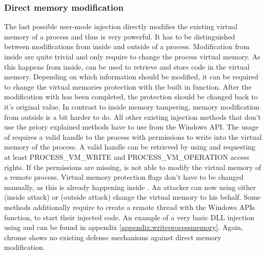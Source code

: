 \subsubsection{Direct memory modification}
The last possible user-mode injection directly modifies the existing virtual memory of a process and thus is very powerful. It has to be distinguished between modifications from inside and outside of a process. Modification from inside are quite trivial and only require to change the process virtual memory. As this happens from inside,  can be used to retrieve and store code in the virtual memory. Depending on which information should be modified, it can be required to change the virtual memories protection with the built in  function. After the modification with  has been completed, the protection should be changed back to it's original value. In contrast to inside memory tampering, memory modification from outside is a bit harder to do. All other existing injection methods that don't use the priory explained methods have to use  from the Windows API. The usage of  requires a valid handle to the process with permissions to write into the virtual memory of the process. A valid handle can be retrieved by using  and requesting at least PROCESS\_VM\_WRITE and PROCESS\_VM\_OPERATION access rights. If the permissions are missing,  is not able to modify the virtual memory of a remote process. Virtual memory protection flags don't have to be changed manually, as this is already happening inside . An attacker can now using either  (inside attack) or  (outside attack) change the virtual memory to his behalf. Some methods additionally require to create a remote thread with the Windows APIs  function, to start their injected code. An example of a very basic DLL injection using  and  can be found in appendix \ref{appendix:writeprocessmemory}. Again, chrome shows no existing defense mechanisms against direct memory modification.
